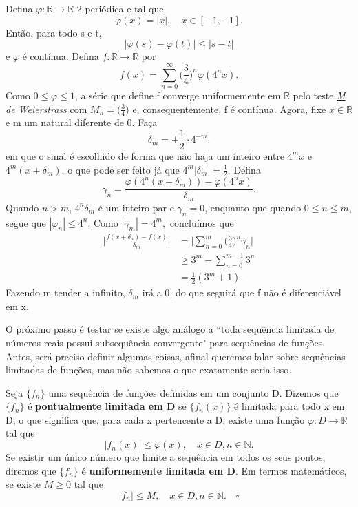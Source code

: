 \documentclass[../analysis_notes.tex]{subfiles}
\begin{document}
\begin{proof*}
	Defina \(\varphi :\mathbb{R}\rightarrow \mathbb{R}\) 2-periódica e tal que
	\[
		\varphi (x)=|x|,\quad x\in [-1, -1].
	\]
	Então, para todo s e t,
	\[
		|\varphi (s)-\varphi (t)|\leq |s-t|
	\]
	e \(\varphi \) é contínua. Defina \(f:\mathbb{R}\rightarrow \mathbb{R}\) por
	\[
		f(x)=\sum\limits_{n=0}^{\infty}\biggl(\frac{3}{4}\biggr)^{n}\varphi (4^{n}x).
	\]
	Como \(0\leq \varphi \leq 1\), a série que define f converge uniformemente em \(\mathbb{R}\) pelo teste \hyperlink{weierstrass_m}{\textit{M de Weierstrass}} com \(M_{n}=\biggl(\frac{3}{4}\biggr)\) e, consequentemente, f é contínua. Agora, fixe \(x\in \mathbb{R}\) e m um natural diferente de 0. Faça
	\[
		\delta_{m}=\pm \frac{1}{2}\cdot 4^{-m}.
	\]
	em que o sinal é escolhido de forma que não haja um inteiro entre \(4^{m}x\) e \(4^{m}(x+\delta_{m})\), o que pode ser feito já que \(4^{m}|\delta_{m}|=\frac{1}{2}\). Defina
	\[
		\gamma_{n}=\frac{\varphi (4^{n}(x+\delta_{m}))-\varphi(4^{n}x)}{\delta_{m}}.
	\]
	Quando \(n>m\), \(4^{n}\delta_{m}\) é um inteiro par e \(\gamma_{n}=0\), enquanto que quando \(0\leq n\leq m\), segue que \(|\varphi_{n}|\leq 4^{n}\). Como \(|\gamma_{m}|=4^{m},\) concluímos que
	\begin{align*}
		\biggl\vert \frac{f(x+\delta_{n})-f(x)}{\delta_{m}} \biggr\vert & =\biggl\vert \sum\limits_{n=0}^{m}\biggl(\frac{3}{4}\biggr)^{n}\gamma_{n} \biggr\vert \\
		                                                                & \geq 3^{m}-\sum\limits_{n=0}^{m-1}3^{n}                                               \\
		                                                                & =\frac{1}{2}(3^{m}+1).
	\end{align*}
	Fazendo m tender a infinito, \(\delta_{m}\) irá a 0, do que seguirá que f não é diferenciável em x. \qedsymbol
\end{proof*}
O próximo passo é testar se existe algo análogo a ``toda sequência limitada de números reais possui subsequência convergente" para sequências de funções. Antes, será preciso definir algumas coisas, afinal queremos falar sobre sequências limitadas de funções, mas não sabemos o que exatamente seria isso.
\begin{def*}
	Seja \(\{f_{n}\}\) uma sequência de funções definidas em um conjunto D. Dizemos que \(\{f_{n}\}\) é \textbf{pontualmente limitada em D} se \(\{f_{n}(x)\}\) é limitada para todo x em D, o que significa que, para cada x pertencente a D, existe uma função \(\varphi :D\rightarrow \mathbb{R}\) tal que
	\[
		|f_{n}(x)|\leq \varphi(x), \quad x\in D, n\in \mathbb{N}.
	\]
	Se existir um único número que limite a sequência em todos os seus pontos, diremos que \(\{f_{n}\}\) é \textbf{uniformemente limitada em D}. Em termos matemáticos, se existe \(M\geq 0\) tal que
	\[
		|f_{n}|\leq M, \quad x\in D, n\in \mathbb{N}.\quad \square
	\]
\end{def*}
\end{document}
